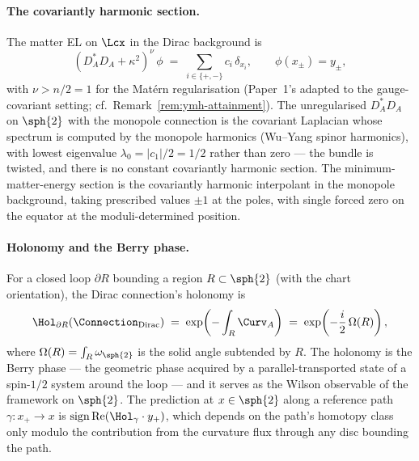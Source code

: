 \paragraph{The covariantly harmonic section.} The matter EL on
$\Lcx$ in the Dirac background is
\[
   (D_A^*D_A + \kappa^2)^\nu\,\phi \;=\; \sum_{i\in\{+,-\}} c_i\,
   \delta_{x_i}, \qquad \phi(x_\pm)=y_\pm,
\]
with $\nu>n/2=1$ for the Mat\'ern regularisation (Paper~1's
\cite[Theorem~13.3]{Vasii2026Paper1} adapted to the gauge-covariant
setting; cf.\ Remark~\ref{rem:ymh-attainment}). The unregularised
$D_A^*D_A$ on $\sph{2}$ with the monopole connection is the
covariant Laplacian whose spectrum is computed by the monopole
harmonics (Wu--Yang spinor harmonics), with lowest eigenvalue
$\lambda_0=|c_1|/2=1/2$ rather than zero --- the bundle is twisted,
and there is no constant covariantly harmonic section. The
minimum-matter-energy section is the
covariantly harmonic interpolant in the monopole background, taking
prescribed values $\pm 1$ at the poles, with single forced zero on
the equator at the moduli-determined position.

\paragraph{Holonomy and the Berry phase.} For a closed loop
$\partial R$ bounding a region $R\subset\sph{2}$ (with the chart
orientation), the Dirac connection's holonomy is
\[
   \Hol_{\partial R}(\Connection_{\mathrm{Dirac}})
   \;=\;\exp\!\left(-\int_R \Curv_A\right)
   \;=\;\exp\!\left(-\frac{i}{2}\,\Omega(R)\right),
\]
where $\Omega(R)=\int_R\omega_{\sph{2}}$ is the solid angle subtended
by $R$. The holonomy is the Berry phase --- the geometric phase
acquired by a parallel-transported state of a spin-$1/2$ system
around the loop --- and it serves as the Wilson observable of the
framework on $\sph{2}$. The prediction at $x\in\sph{2}$ along a
reference path $\gamma\colon x_+\to x$ is
$\mathrm{sign}\,\mathrm{Re}(\Hol_\gamma\cdot y_+)$, which depends on
the path's homotopy class only modulo the contribution from the
curvature flux through any disc bounding the path.

